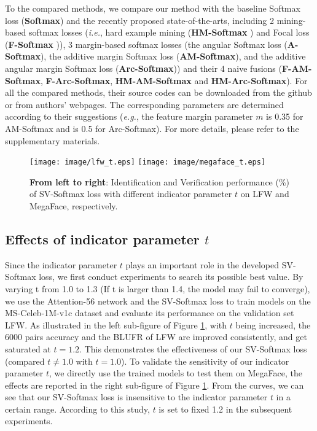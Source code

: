 \documentclass[10pt,twocolumn,letterpaper]{article}
\begin{document}
To the compared methods, we compare our method with the baseline Softmax loss (\textbf{Softmax}) and the recently proposed state-of-the-arts, including 2 mining-based softmax losses (\textit{i.e.}, hard example mining (\textbf{HM-Softmax} \cite{OHEM}) and Focal loss (\textbf{F-Softmax} \cite{Focal})), 3 margin-based softmax losses (the angular Softmax loss (\textbf{A-Softmax}\cite{Angular}), the additive margin Softmax loss (\textbf{AM-Softmax}\cite{AM-Softmax}), and the additive angular margin Softmax loss (\textbf{Arc-Softmax}\cite{Arc-Softmax})) and their 4 naive fusions (\textbf{F-AM-Softmax}, \textbf{F-Arc-Softmax}, \textbf{HM-AM-Softmax} and \textbf{HM-Arc-Softmax}). For all the compared methods, their source codes can be downloaded from the github or from authors' webpages. The corresponding parameters are determined according to their suggestions (\textit{e.g.}, the feature margin parameter $m$ is 0.35 for AM-Softmax and is 0.5 for Arc-Softmax). For more details, please refer to the supplementary materials.

\begin{figure}[t]
\begin{center}
\texttt{[image: image/lfw\_t.eps]}
   \texttt{[image: image/megaface\_t.eps]}
\end{center}
   \caption{\textbf{From left to right}: Identification and Verification performance (\%) of SV-Softmax loss with different indicator parameter $t$ on LFW and MegaFace, respectively. }
\label{fig:parameter}
\end{figure}






\subsection{Effects of indicator parameter $t$}
Since the indicator parameter $t$ plays an important role in the developed SV-Softmax loss, we first conduct experiments to
search its possible best value. By varying t from 1.0 to 1.3 (If t is larger than 1.4, the model may fail to converge), we use the Attention-56 network and the SV-Softmax loss to train models on the MS-Celeb-1M-v1c dataset and evaluate its performance on the validation set LFW. As illustrated in the left sub-figure of Figure \ref{fig:parameter}, with $t$ being increased, the 6000 pairs accuracy and the BLUFR of LFW are improved consistently, and get saturated at $t=1.2$. This demonstrates the effectiveness of our SV-Softmax loss (compared $t\neq 1.0$ with $t=1.0$). To validate the sensitivity of our indicator parameter $t$, we directly use the trained models to test them on MegaFace, the effects are reported in the right sub-figure of Figure \ref{fig:parameter}. From the curves, we can see that our SV-Softmax loss is insensitive to the indicator parameter $t$ in a certain range. According to this study, $t$ is set to fixed 1.2 in the subsequent experiments.
\end{document}
